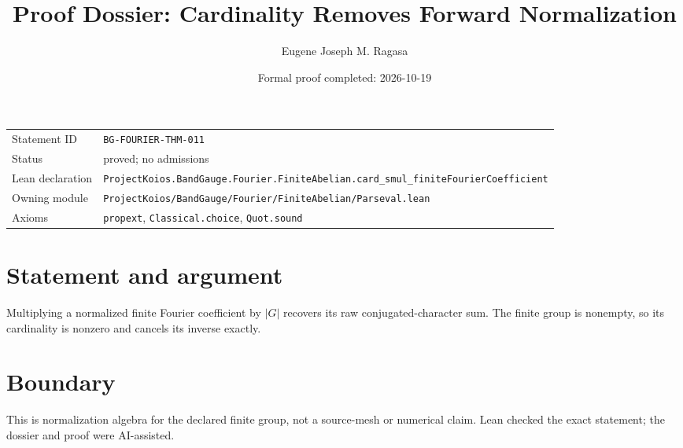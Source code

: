 \documentclass[11pt]{article}
\title{Proof Dossier: Cardinality Removes Forward Normalization}
\author{Eugene Joseph M. Ragasa}
\date{Formal proof completed: 2026-10-19}
\begin{document}
\maketitle
\noindent\begin{tabularx}{\textwidth}{@{}lX@{}}\toprule
Statement ID & \texttt{BG-FOURIER-THM-011} \\
Status & proved; no admissions \\
Lean declaration & \texttt{ProjectKoios.BandGauge.Fourier.FiniteAbelian.}\newline\texttt{card\_smul\_finiteFourierCoefficient} \\
Owning module & \texttt{ProjectKoios/BandGauge/Fourier/FiniteAbelian/Parseval.lean} \\
Axioms & \texttt{propext}, \texttt{Classical.choice}, \texttt{Quot.sound} \\
\bottomrule\end{tabularx}
\section{Statement and argument}
Multiplying a normalized finite Fourier coefficient by $|G|$ recovers its raw conjugated-character sum. The finite group is nonempty, so its cardinality is nonzero and cancels its inverse exactly.
\section{Boundary}
This is normalization algebra for the declared finite group, not a source-mesh or numerical claim. Lean checked the exact statement; the dossier and proof were AI-assisted.
\end{document}
